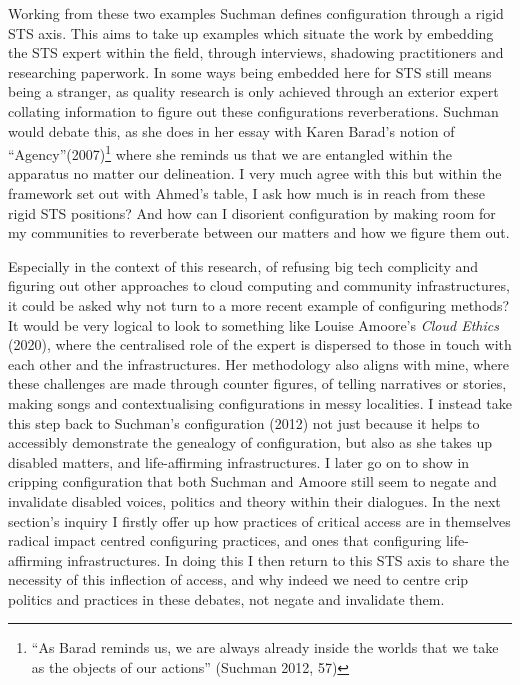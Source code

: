 Working from these two examples Suchman defines configuration through a
rigid STS axis. This aims to take up examples which situate the work by
embedding the STS expert within the field, through interviews, shadowing
practitioners and researching paperwork. In some ways being embedded
here for STS still means being a stranger, as quality research is only
achieved through an exterior expert collating information to figure out
these configurations reverberations. Suchman would debate this, as she
does in her essay with Karen Barad's notion of
``Agency''(2007)\footnote{``As Barad reminds us, we are always already
  inside the worlds that we take as the objects of our actions''
  (Suchman 2012, 57)} where she reminds us that we are entangled within
the apparatus no matter our delineation. I very much agree with this but
within the framework set out with Ahmed's table, I ask how much is in
reach from these rigid STS positions? And how can I disorient
configuration by making room for my communities to reverberate between
our matters and how we figure them out.

Especially in the context of this research, of refusing big tech
complicity and figuring out other approaches to cloud computing and
community infrastructures, it could be asked why not turn to a more
recent example of configuring methods? It would be very logical to look
to something like Louise Amoore's \emph{Cloud Ethics} (2020), where the
centralised role of the expert is dispersed to those in touch with each
other and the infrastructures. Her methodology also aligns with mine,
where these challenges are made through counter figures, of telling
narratives or stories, making songs and contextualising configurations
in messy localities. I instead take this step back to Suchman's
configuration (2012) not just because it helps to accessibly demonstrate
the genealogy of configuration, but also as she takes up disabled
matters, and life-affirming infrastructures. I later go on to show in
cripping configuration that both Suchman and Amoore still seem to negate
and invalidate disabled voices, politics and theory within their
dialogues. In the next section's inquiry I firstly offer up how
practices of critical access are in themselves radical impact centred
configuring practices, and ones that configuring life-affirming
infrastructures. In doing this I then return to this STS axis to share
the necessity of this inflection of access, and why indeed we need to
centre crip politics and practices in these debates, not negate and
invalidate them.

